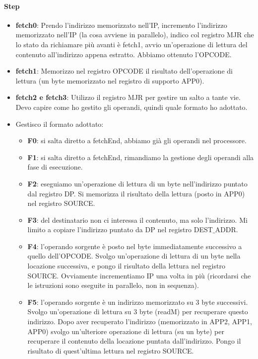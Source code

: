 \documentclass[11pt]{report}
\begin{document}
\paragraph{Step}
\begin{itemize}
\item \textbf{fetch0}: Prendo l'indirizzo memorizzato nell'IP, incremento l'indirizzo memorizzato nell'IP (la cosa avviene in parallelo), indico col registro MJR che lo stato da richiamare più avanti è fetch1, avvio un'operazione di lettura del contenuto all'indirizzo appena estratto. Abbiamo ottenuto l'OPCODE.
\item \textbf{fetch1}: Memorizzo nel registro OPCODE il risultato dell'operazione di lettura (un byte memorizzato nel registro di supporto APP0).
\item \textbf{fetch2 e fetch3}: Utilizzo il registro MJR per gestire un salto a tante vie. Devo capire come ho gestito gli operandi, quindi quale formato ho adottato.
\item Gestisco il formato adottato:
\begin{itemize}
\item \textbf{F0}: si salta diretto a fetchEnd, abbiamo già gli operandi nel processore.
\item \textbf{F1}: si salta diretto a fetchEnd, rimandiamo la gestione degli operandi alla fase di esecuzione.
\item \textbf{F2}: eseguiamo un'operazione di lettura di un byte nell'indirizzo puntato dal registro DP. Si memorizza il risultato della lettura (posto in APP0) nel registro SOURCE.
\item \textbf{F3}: del destinatario non ci interessa il contenuto, ma solo l'indirizzo. Mi limito a copiare l'indirizzo puntato da DP nel registro DEST$\_$ADDR.
\item \textbf{F4}: l'operando sorgente è posto nel byte immediatamente successivo a quello dell'OPCODE. Svolgo un'operazione di lettura di un byte nella locazione successiva, e pongo il risultato della lettura nel registro SOURCE. Ovviamente incrementiamo IP una volta in più (ricordarsi che le istruzioni sono eseguite in parallelo, non in sequenza).
\item \textbf{F5}: l'operando sorgente è un indirizzo memorizzato su 3 byte successivi. Svolgo un'operazione di lettura su 3 byte (readM) per recuperare questo indirizzo. Dopo aver recuperato l'indirizzo (memorizzato in APP2, APP1, APP0) svolgo un'ulteriore operazione di lettura (su un byte) per recuperare il contenuto della locazione puntata dall'indirizzo. Pongo il risultato di quest'ultima lettura nel registro SOURCE.

\end{itemize}
\end{itemize}
\end{document}

